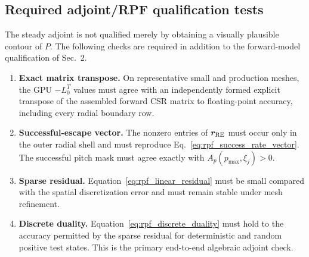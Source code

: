 \documentclass[11pt]{article}
\begin{document}
\subsection{Required adjoint/RPF qualification tests}
\label{sec:rpf_qualification}

The steady adjoint is not qualified merely by obtaining a visually plausible contour of
$P$.  The following checks are required in addition to the forward-model qualification
of Sec.~2.

\begin{enumerate}
 \item \textbf{Exact matrix transpose.}
       On representative small and production meshes, the GPU $-L_0^T$ values must agree
       with an independently formed explicit transpose of the assembled forward CSR
       matrix to floating-point accuracy, including every radial boundary row.

 \item \textbf{Successful-escape vector.}
       The nonzero entries of $\bm r_{\rm RE}$ must occur only in the outer radial shell
       and must reproduce Eq.~\eqref{eq:rpf_success_rate_vector}.  The successful pitch
       mask must agree exactly with
       $A_p(p_{\max},\xi_j)>0$.

 \item \textbf{Sparse residual.}
       Equation~\eqref{eq:rpf_linear_residual} must be small compared with the spatial
       discretization error and must remain stable under mesh refinement.

 \item \textbf{Discrete duality.}
       Equation~\eqref{eq:rpf_discrete_duality} must hold to the accuracy permitted by
       the sparse residual for deterministic and random positive test states.  This is
       the primary end-to-end algebraic adjoint check.


\end{enumerate}
\end{document}
